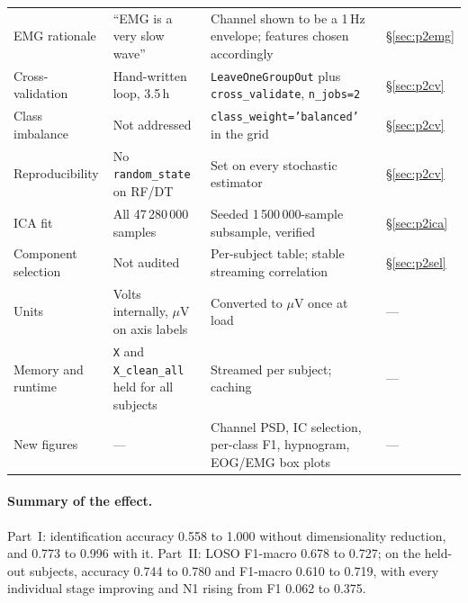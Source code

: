 \documentclass[11pt,a4paper]{article}
\newcommand{\hertz}{Hz}
\newcommand{\volt}{V}
\newcommand{\micro}{\ensuremath{\mu}}
\newcommand{\num}[1]{#1}
\newcommand{\si}[1]{#1}
\newcommand{\SI}[2]{#1\,#2}
\begin{document}
\begin{longtable}{p{4.0cm}p{4.9cm}p{4.5cm}l}
EMG rationale & ``EMG is a very slow wave'' & Channel shown to be a \SI{1}{\hertz} envelope; features chosen accordingly & \S\ref{sec:p2emg} \\
Cross-validation & Hand-written loop, 3.5\,h & \texttt{LeaveOneGroupOut} plus \texttt{cross\_validate}, \texttt{n\_jobs=2} & \S\ref{sec:p2cv} \\
Class imbalance & Not addressed & \texttt{class\_weight='balanced'} in the grid & \S\ref{sec:p2cv} \\
Reproducibility & No \texttt{random\_state} on RF/DT & Set on every stochastic estimator & \S\ref{sec:p2cv} \\
ICA fit & All \num{47\,280\,000} samples & Seeded \num{1\,500\,000}-sample subsample, verified & \S\ref{sec:p2ica} \\
Component selection & Not audited & Per-subject table; stable streaming correlation & \S\ref{sec:p2sel} \\
Units & Volts internally, \si{\micro\volt} on axis labels & Converted to \si{\micro\volt} once at load & --- \\
Memory and runtime & \texttt{X} and \texttt{X\_clean\_all} held for all subjects & Streamed per subject; caching & --- \\
New figures & --- & Channel PSD, IC selection, per-class F1, hypnogram, EOG/EMG box plots & --- \\
\bottomrule
\end{longtable}

\paragraph{Summary of the effect.} Part~I: identification accuracy \num{0.558} to
\num{1.000} without dimensionality reduction, and \num{0.773} to \num{0.996} with it.
Part~II: LOSO F1-macro \num{0.678} to \num{0.727}; on the held-out subjects, accuracy
\num{0.744} to \num{0.780} and F1-macro \num{0.610} to \num{0.719}, with every individual
stage improving and N1 rising from F1 \num{0.062} to \num{0.375}.
\end{document}
